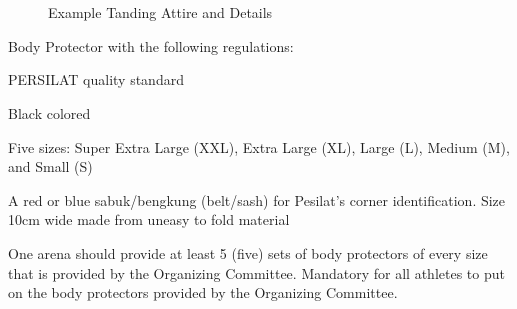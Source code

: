 \begin{legal}
\begin{legal}
    \begin{figure}[h!]
    \centering
    ~
    \\
    ~
    \caption{Example Tanding Attire and Details}
    \end{figure}


    \item Body Protector with the following regulations:
    \begin{legal}
        \item PERSILAT quality standard
        \item Black colored
        \item Five sizes: Super Extra Large (XXL), Extra Large (XL), Large (L), Medium (M), and Small (S)
        \item A red or blue sabuk/bengkung (belt/sash) for Pesilat’s corner identification. Size 10cm wide made from uneasy to fold material
        \item One arena should provide at least 5 (five) sets of body protectors of every size that is provided by the Organizing Committee. Mandatory for all athletes to put on the body protectors provided by the Organizing Committee.
    \end{legal}


\end{legal}
\end{legal}
